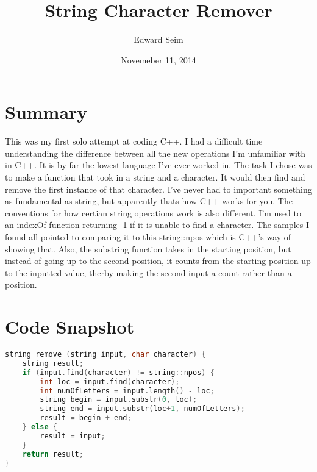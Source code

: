 \documentclass[a4paper]{article}
\title{String Character Remover}
\author{Edward Seim}
\date{Novemeber 11, 2014}
\begin{document}
\maketitle

\section{Summary}

This was my first solo attempt at coding C++. I had a difficult time understanding the difference between all the new operations I'm unfamiliar with in C++. It is by far the lowest language I've ever worked in. The task I chose was to make a function that took in a string and a character. It would then find and remove the first instance of that character. I've never had to important something as fundamental as string, but apparently thats how C++ works for you. The conventions for how certian string operations work is also different. I'm used to an indexOf function returning -1 if it is unable to find a character. The samples I found all pointed to comparing it to this string::npos which is C++'s way of showing that. Also, the substring function takes in the starting position, but instead of going up to the second position, it counts from the starting position up to the inputted value, therby making the second input a count rather than a position.

\section{Code Snapshot}

\begin{lstlisting}[language=C++, caption={C++ code using listings}]
string remove (string input, char character) {
    string result;
    if (input.find(character) != string::npos) {
        int loc = input.find(character);
        int numOfLetters = input.length() - loc;
        string begin = input.substr(0, loc);
        string end = input.substr(loc+1, numOfLetters);
        result = begin + end;
    } else {
        result = input;
    }
    return result;
}
\end{lstlisting}
\end{document}
